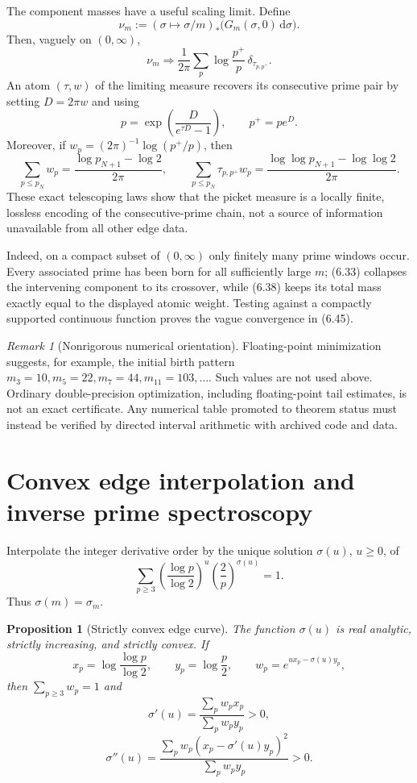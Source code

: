 \documentclass[11pt]{article}
\newtheorem{proposition}[theorem]{Proposition}
\theoremstyle{definition}
\theoremstyle{remark}
\newtheorem{remark}[theorem]{Remark}
\newcommand{\dd}{\,\mathrm d}
\begin{document}
The component masses have a useful scaling limit.  Define
\[
 \nu_m:=(\sigma\mapsto\sigma/m)_*
        \bigl(G_m(\sigma,0)\dd\sigma\bigr).
\]
Then, vaguely on $(0,\infty)$,
\[
 \boxed{
 \nu_m\Longrightarrow
 \frac1{2\pi}\sum_p\log\frac{p^+}{p}\,
       \delta_{\tau_{p,p^+}}.}
\tag{6.45}
\]
An atom $(\tau,w)$ of the limiting measure recovers its consecutive
prime pair by setting $D=2\pi w$ and using
\[
 p=\exp\!\left(\frac{D}{e^{\tau D}-1}\right),
 \qquad p^+=pe^D.
\tag{6.46}
\]
Moreover, if $w_p=(2\pi)^{-1}\log(p^+/p)$, then
\[
 \sum_{p\le p_N}w_p
 =\frac{\log p_{N+1}-\log2}{2\pi},
 \qquad
 \sum_{p\le p_N}\tau_{p,p^+}w_p
 =\frac{\log\log p_{N+1}-\log\log2}{2\pi}.
\tag{6.47}
\]
These exact telescoping laws show that the picket measure is a locally
finite, lossless encoding of the consecutive-prime chain, not a source
of information unavailable from all other edge data.

Indeed, on a compact subset of $(0,\infty)$ only finitely many prime windows
occur.  Every associated prime has been born for all sufficiently large $m$;
(6.33) collapses the intervening component to its crossover, while (6.38)
keeps its total mass exactly equal to the displayed atomic weight.  Testing
against a compactly supported continuous function proves the vague convergence
in (6.45).

\begin{remark}[Nonrigorous numerical orientation]
Floating-point minimization suggests, for example, the initial birth pattern
$m_3=10,m_5=22,m_7=44,m_{11}=103,\ldots$.
Such values are not used above.  Ordinary double-precision optimization,
including floating-point tail estimates, is not an exact certificate.  Any
numerical table promoted to theorem status must instead be verified by
directed interval arithmetic with archived code and data.
\end{remark}


\section{Convex edge interpolation and inverse prime spectroscopy}
\label{sec:edge-spectroscopy}

Interpolate the integer derivative order by the unique solution $\sigma(u)$, $u\ge0$,
of
\[
 \sum_{p\ge3}
 \left(\frac{\log p}{\log2}\right)^u
 \left(\frac2p\right)^{\sigma(u)}=1.
\tag{7.1}
\]
Thus $\sigma(m)=\sigma_m$.

\begin{proposition}[Strictly convex edge curve]
\label{prop:convex-edge}
The function $\sigma(u)$ is real analytic, strictly increasing, and strictly convex.
If
\[
 x_p=\log\frac{\log p}{\log2},
 \qquad y_p=\log\frac p2,
 \qquad w_p=e^{ux_p-\sigma(u)y_p},
\]
then $\sum_{p\ge3}w_p=1$ and
\[
 \sigma'(u)=\frac{\sum_pw_px_p}{\sum_pw_py_p}>0,
\tag{7.2}
\]
\[
 \boxed{
 \sigma''(u)=
 \frac{\sum_pw_p(x_p-\sigma'(u)y_p)^2}{\sum_pw_py_p}>0.
 }
\tag{7.3}
\]
\end{proposition}
\end{document}
